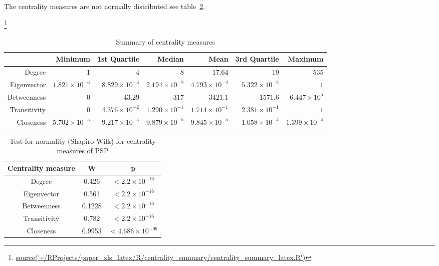 The centrality measures are not normally distributed see table~\ref{Table:Test for normality (Shapiro-Wilk) for centrality measures of PSP}.



\footnote{\url{source('~/RProjects/paper_xls_latex/R/centrality_summary/centrality_summary_latex.R')}}
\begin{table}[ht]
\centering
\begin{tabular}{rrrrrrr}
  \hline
 & Minimum & 1st Quartile & Median & Mean & 3rd Quartile & Maximum \\ 
  \hline
Degree & $1 $ & $4 $ & $8 $ & $17.64$  & $19$ & $535$ \\ 
  Eigenvector & $1.821 \times 10^{-6}$ & $8.829 \times 10^{-3}$ & $2.194 \times 10^{-2}$ & $4.793 \times 10^{-2}$ & $5.322 \times 10^{-2}$ & $1 $ \\ 
  Betweenness & $0 $ & $43.29 $ & $317 $ & $3421.1$ & $1571.6$& $6.447 \times 10^{5}$ \\ 
  Transitivity & $0 $ & $4.376 \times 10^{-2}$ & $1.290 \times 10^{-1}$ & $1.714 \times 10^{-1}$ & $2.381 \times 10^{-1}$ & $1 $ \\ 
  Closeness & $5.702 \times 10^{-5}$ & $9.217 \times 10^{-5}$ & $9.879 \times 10^{-5}$ & $9.845 \times 10^{-5}$ & $1.058 \times 10^{-4}$ & $1.399 \times 10^{-4}$ \\ 
   \hline
\end{tabular}
\caption{Summary of centrality measures} 
\label{Table:Summary of centrality measures}
\end{table}


\begin{table}[h]
    \centering
    \begin{tabular}{c|c|c}
       Centrality measure  &  W& p\\
       \hline
       
       Degree  & 0.426 & $<2.2 \times 10^{-16}$ \\
       Eigenvector &0.561  & $<2.2 \times 10^{-16}$ \\
       Betweenness &0.1228& $<2.2 \times 10^{-16}$ \\
       Transitivity &0.782 & $<2.2 \times 10^{-16}$\\
       Closeness &0.9953& $<4.686 \times 10^{-09}$\\ 
    \end{tabular}
    \caption{Test for normality (Shapiro-Wilk) for centrality measures of PSP}
    \label{Table:Test for normality (Shapiro-Wilk) for centrality measures of PSP}
\end{table}

